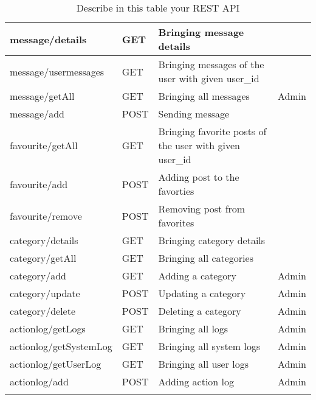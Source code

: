 \begin{longtable}{|p{}|p{} |p{}|p{}|}
message/details & GET & Bringing message details & \\\hline
message/usermessages & GET & Bringing messages of the user with given user\_id & \\\hline
message/getAll & GET & Bringing all messages  &Admin\\\hline
message/add & POST & Sending message &\\\hline

favourite/getAll & GET & Bringing favorite posts of the user with given user\_id & \\\hline
favourite/add & POST & Adding post to the favorties  &\\\hline
favourite/remove & POST & Removing post from favorites&\\\hline


category/details & GET & Bringing category details & \\\hline
category/getAll & GET & Bringing all categories &\\\hline
category/add & GET & Adding a category &Admin\\\hline
category/update & POST & Updating a category &Admin\\\hline
category/delete & POST & Deleting a category &Admin\\\hline

actionlog/getLogs & GET & Bringing all logs &Admin\\\hline
actionlog/getSystemLog & GET & Bringing all system logs &Admin\\\hline
actionlog/getUserLog & GET & Bringing all user logs &Admin\\\hline
actionlog/add & POST & Adding action log &Admin\\\hline



\caption{Describe in this table your REST API}
\label{tab:termGlossary}
\end{longtable}

\clearpage